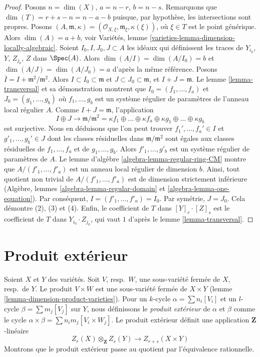 \begin{proof}
Posons $n = \dim(X)$, $a = n - r$, $b = n - s$. Remarquons que
$\dim(T) = r + s - n = n - a - b$ puisque, par hypothèse, les
intersections sont propres. Posons $(A, \mathfrak m, \kappa) =
(\mathcal{O}_{X, \xi}, \mathfrak m_\xi, \kappa(\xi))$, où $\xi \in T$
est le point générique. Alors $\dim(A) = a + b$, voir
Variétés, lemme \ref{varieties-lemma-dimension-locally-algebraic}.
Soient $I_0, I, J_0, J \subset A$ les idéaux qui définissent les traces de
$Y_{i_0}$, $Y$, $Z_{j_0}$, $Z$ dans $\Spec(A)$.
Alors $\dim(A/I) = \dim(A/I_0) = b$ et $\dim(A/J) = \dim(A/J_0) = a$
d'après la même référence. Posons $\overline{I} = I + \mathfrak m^2/\mathfrak m^2$.
Alors $I \subset I_0 \subset \mathfrak m$ et
$J \subset J_0 \subset \mathfrak m$, et $I + J = \mathfrak m$.
Le lemme \ref{lemma-transversal} et sa démonstration montrent que
$I_0 = (f_1, \ldots, f_a)$ et $J_0 = (g_1, \ldots, g_b)$
où $f_1, \ldots, g_b$ est un système régulier de paramètres
de l'anneau local régulier $A$. Comme $I + J = \mathfrak m$, l'application
$$
I \oplus J \to
\mathfrak m/\mathfrak m^2 =
\kappa f_1
\oplus \ldots \oplus
\kappa f_a
\oplus
\kappa g_1
\oplus \ldots \oplus
\kappa g_b
$$
est surjective. Nous en déduisons que l'on peut trouver
$f_1', \ldots, f_a' \in I$ et $g'_1, \ldots, g_b' \in J$
dont les classes résiduelles dans $\mathfrak m/\mathfrak m^2$ sont égales aux
classes résiduelles de $f_1, \ldots, f_a$ et de $g_1, \ldots, g_b$.
Alors $f'_1, \ldots, g'_b$ est un système régulier de paramètres de $A$.
Le lemme d'algèbre \ref{algebra-lemma-regular-ring-CM} montre que
$A/(f'_1, \ldots, f'_a)$ est un anneau local régulier de dimension $b$.
Ainsi, tout quotient non trivial de $A/(f'_1, \ldots, f'_a)$
est de dimension strictement inférieure
(Algèbre, lemmes \ref{algebra-lemma-regular-domain} et
\ref{algebra-lemma-one-equation}). Par conséquent, $I = (f'_1, \ldots, f'_a) = I_0$.
Par symétrie, $J = J_0$. Cela démontre (2), (3) et (4).
Enfin, le coefficient de $T$ dans $[Y]_r \cdot [Z]_s$
est le coefficient de $T$ dans $Y_{i_0} \cdot Z_{j_0}$, qui vaut
$1$ d'après le lemme \ref{lemma-transversal}.
\end{proof}



\section{Produit extérieur}
\label{section-exterior-product}

\noindent
Soient $X$ et $Y$ des variétés.
Soit $V$, resp.\ $W$, une sous-variété fermée de $X$, resp.\ de $Y$.
Le produit $V\times W$ est une sous-variété fermée de $X\times Y$
(lemme \ref{lemma-dimension-product-varieties}).
Pour un $k$-cycle $\alpha = \sum n_i [V_i]$ et un $l$-cycle
$\beta = \sum m_j [V_j]$ sur $Y$, nous définissons le
{\it produit extérieur} de $\alpha$ et $\beta$ comme le cycle
$\alpha \times \beta = \sum n_i m_j [V_i \times W_j]$.
Le produit extérieur définit une application $\mathbf{Z}$-linéaire
$$
Z_r(X) \otimes_\mathbf{Z} Z_s(Y) \longrightarrow Z_{r + s}(X \times Y)
$$
Montrons que le produit extérieur passe au quotient par l'équivalence rationnelle.

